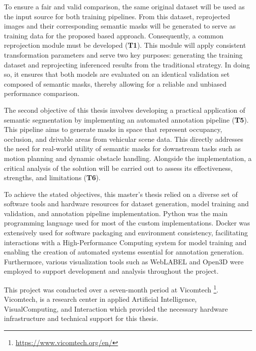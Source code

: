 To ensure a fair and valid comparison, the same original dataset will be used as the input source for both training pipelines. From this dataset,  reprojected images and their corresponding semantic masks will be generated to serve as training data for the proposed  based approach. Consequently, a common  reprojection module must be developed (\textbf{T1}). This module will apply consistent transformation parameters and serve two key purposes: generating the  training dataset and reprojecting inferenced results from the traditional strategy. In doing so, it ensures that both models are evaluated on an identical validation set composed of  semantic masks, thereby allowing for a reliable and unbiased performance comparison.

The second objective of this thesis involves developing a practical application of  semantic segmentation by implementing an automated annotation pipeline (\textbf{T5}). This pipeline aims to generate masks in  space that represent occupancy, occlusion, and drivable areas from vehicular scene data. This directly addresses the need for real-world utility of  semantic masks for downstream tasks such as motion planning and dynamic obstacle handling. Alongside the implementation, a critical analysis of the solution will be carried out to assess its effectiveness, strengths, and limitations (\textbf{T6}).

To achieve the stated objectives, this master's thesis relied on a diverse set of software tools and hardware resources for dataset generation, model training and validation, and annotation pipeline implementation. Python was the main programming language used for most of the custom implementations. Docker was extensively used for software packaging and environment consistency, facilitating interactions with a High-Performance Computing system for model training and enabling the creation of automated systems essential for annotation generation. Furthermore, various visualization tools such as WebLABEL and Open3D were employed to support development and analysis throughout the project.

This project was conducted over a seven-month period at Vicomtech  \footnote{\url{https://www.vicomtech.org/en/}}. Vicomtech, is a research center in applied Artificial Intelligence, VisualComputing, and Interaction which provided the necessary hardware infrastructure and technical support for this thesis.



